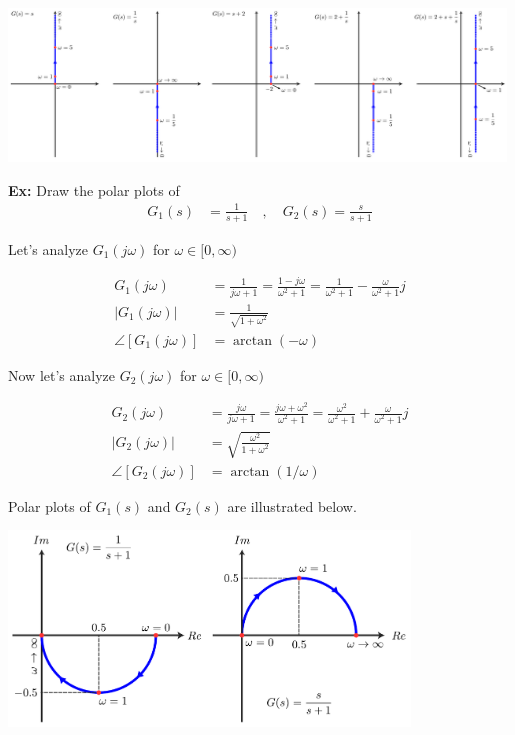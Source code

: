 \documentclass{article}
\begin{document}
  \begin{minipage}[h]{1\linewidth}
    \begin{center}
      \includegraphics[width=0.99\textwidth]{polar}
    \end{center}
  \end{minipage}

\newpage

\textbf{Ex:} Draw the polar plots of 
%
\begin{align*}
 G_1(s) &= \frac{1}{s+1}
 \quad , \quad
 G_2(s) = \frac{s}{s+1}
\end{align*}

Let's analyze $G_1(j \omega)$ for $\omega \in [0 , \infty)$

\begin{align*}
 G_1(j \omega) &= \frac{1}{j \omega +1} = \frac{1 - j \omega}{\omega^2 +1} 
= \frac{1}{\omega^2 +1} - \frac{\omega}{\omega^2 +1} j
\\
| G_1(j \omega) | &= \frac{1}{ \sqrt{1 + \omega^2} }
\\
\angle [ G_1(j \omega) ] &= \arctan (-\omega) 
\end{align*}

Now let's analyze $G_2(j \omega)$ for $\omega \in [0 , \infty)$

\begin{align*}
 G_2(j \omega) &= \frac{j \omega}{j \omega +1} = \frac{j \omega + \omega^2}{\omega^2 +1} 
= \frac{\omega^2}{\omega^2 +1} + \frac{\omega}{\omega^2 +1} j
\\
| G_2(j \omega) | &= \sqrt{ \frac{ \omega^2 }{ 1 + \omega^2 } }
\\
\angle [ G_2(j \omega) ] &= \arctan (1 / \omega) 
\end{align*}

Polar plots of $G_1(s)$ and $G_2(s)$ are illustrated below. 

\vspace{6 pt}

  \begin{minipage}[h]{1\linewidth}
    \begin{center}
      \includegraphics[width=0.8\textwidth]{polar2}
    \end{center}
  \end{minipage}
\end{document}
